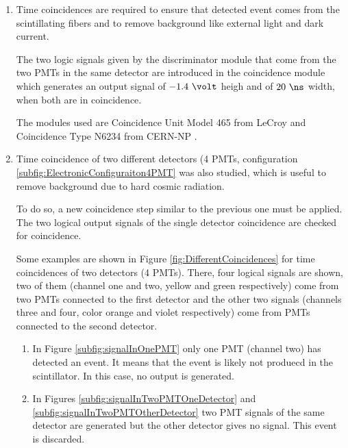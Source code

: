 \begin{enumerate}
\begin{enumerate}
\item{} Time coincidences are required to ensure that detected event comes from the scintillating fibers and to remove background like external light and dark current. %

The two logic signals given by the discriminator module that come from the two PMTs in the same detector are introduced in the coincidence module which generates an output signal of $-1.4~\volt$ heigh and of $20~\ns$ width, when both are in coincidence.

The modules used are Coincidence Unit Model 465 from LeCroy \cite{DataSheetCoincidenceLeCroy} and Coincidence Type N6234 from CERN-NP \cite{DataSheetCoincidenceCERN}.

\item{} Time coincidence of two different detectors (4 PMTs, configuration \ref{subfig:ElectronicConfiguraiton4PMT} was also studied, which is useful to remove background due to hard cosmic radiation.

To do so, a new coincidence step similar to the previous one must be applied. The two logical output signals of the single detector coincidence are checked for coincidence.

Some examples are shown in Figure \ref{fig:DifferentCoincidences} for time coincidences of two detectors (4 PMTs). There, four logical signals are shown, two of them (channel one and two, yellow and green respectively) come from two PMTs connected to the first detector and the other two signals (channels three and four, color orange and violet respectively) come from PMTs connected to the second detector.

\begin{enumerate}
\item{} In Figure \ref{subfig:signalInOnePMT} only one PMT (channel two) has detected an event. It means that the event is likely not produecd in the scintillator. In this case, no output is generated.

\item{} In Figures \ref{subfig:signalInTwoPMTOneDetector} and \ref{subfig:signalInTwoPMTOtherDetector} two PMT signals of the same detector are generated but the other detector gives no signal. This event is discarded.


\end{enumerate}
\end{enumerate}
\end{enumerate}
